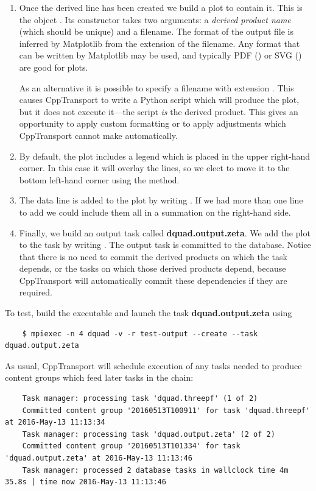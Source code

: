 \documentclass[11pt,a4paper]{article}
\renewcommand{\texttt}[1]{{\ttfamily\fontseries{l}\selectfont{#1}}}
\newcommand{\repoobject}[1]{{\ttfamily\bfseries\small #1}}
\newcommand{\packagefont}{\sffamily}
\newcommand{\CppTransport}{{\packagefont CppTransport}}
\newcommand{\Matplotlib}{{\packagefont Matplotlib}}
\newcommand{\file}[1]{\texttt{{#1}}}
\begin{document}
\begin{enumerate}
	\item Once the derived line has been created we build a plot
	to contain it. This is the object
	\texttt{time_series_plot<>}.
	Its constructor takes two arguments:
	a \emph{derived product name} (which should be unique)
	and a filename.
	The format of the output file is inferred by
	{\Matplotlib} from the extension of the filename.
	Any format that can be written by {\Matplotlib} may be used,
	and typically PDF (\file{.pdf}) or SVG (\file{.svg})
	are good for plots.
	
	As an alternative it is possible to specify a filename with extension
	\file{.py}.
	This causes {\CppTransport} to write a Python script which will produce
	the plot, but it does not execute it---the script \emph{is} the derived
	product.
	This gives an opportunity to apply custom formatting or to apply
	adjustments which {\CppTransport} cannot make automatically.
	
	\item By default, the plot includes a legend
	which is placed in the upper right-hand corner.
	In this case it will overlay the lines, so we elect to move it to the bottom
	left-hand corner using the
	\texttt{set_legend_position()} method.
	
	\item The data line \texttt{bg_fields} is added to the plot
	by writing
	\texttt{bg_plot += bg_fields}.
	If we had more than one line to add we could include them all in a summation
	on the right-hand side.
	
	\item Finally, we build an output task called
	\repoobject{dquad.output.zeta}. We add the plot to the task
	by writing
	\texttt{out_tk += bg_plot}.
	The output task is committed to the database.
	Notice that there is no need to commit the derived products on which the
	task depends,
	or the tasks on which those derived products depend,
	because {\CppTransport} will automatically commit these dependencies if they are
	required.
\end{enumerate}
To test, build the executable and launch the task
\repoobject{dquad.output.zeta} using
\begin{verbatim}
	$ mpiexec -n 4 dquad -v -r test-output --create --task dquad.output.zeta	
\end{verbatim}
As usual, {\CppTransport} will schedule execution of any tasks needed to produce
content groups which feed later tasks in the chain:
\begin{verbatim}
	Task manager: processing task 'dquad.threepf' (1 of 2)
	Committed content group '20160513T100911' for task 'dquad.threepf' at 2016-May-13 11:13:34
	Task manager: processing task 'dquad.output.zeta' (2 of 2)
	Committed content group '20160513T101334' for task 'dquad.output.zeta' at 2016-May-13 11:13:46
	Task manager: processed 2 database tasks in wallclock time 4m 35.8s | time now 2016-May-13 11:13:46	
\end{verbatim}
\end{document}

